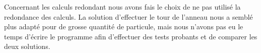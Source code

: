 \par Concernant les calculs redondant nous avons fais le choix de ne pas utilisé la redondance 
des calculs. La solution d'effectuer le tour de l'anneau nous a semblé plus adapté 
pour de grosse quantité de particule, mais nous n'avons pas eu le temps d'écrire le programme
afin d'effectuer des tests probants et de comparer les deux solutions.\\

